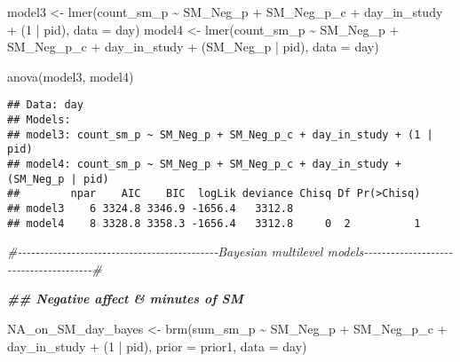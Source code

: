 \documentclass[
]{article}
\newenvironment{Shaded}{\begin{snugshade}}{\end{snugshade}}
\newcommand{\AttributeTok}[1]{\textcolor[rgb]{0.77,0.63,0.00}{#1}}
\newcommand{\CommentTok}[1]{\textcolor[rgb]{0.56,0.35,0.01}{\textit{#1}}}
\newcommand{\DecValTok}[1]{\textcolor[rgb]{0.00,0.00,0.81}{#1}}
\newcommand{\DocumentationTok}[1]{\textcolor[rgb]{0.56,0.35,0.01}{\textbf{\textit{#1}}}}
\newcommand{\FunctionTok}[1]{\textcolor[rgb]{0.00,0.00,0.00}{#1}}
\newcommand{\NormalTok}[1]{#1}
\newcommand{\OtherTok}[1]{\textcolor[rgb]{0.56,0.35,0.01}{#1}}
\newcommand{\SpecialCharTok}[1]{\textcolor[rgb]{0.00,0.00,0.00}{#1}}
\begin{document}
\begin{Shaded}
\begin{Highlighting}[]
\NormalTok{model3 }\OtherTok{\textless{}{-}} \FunctionTok{lmer}\NormalTok{(count\_sm\_p }\SpecialCharTok{\textasciitilde{}}\NormalTok{ SM\_Neg\_p }\SpecialCharTok{+}\NormalTok{ SM\_Neg\_p\_c }\SpecialCharTok{+}\NormalTok{ day\_in\_study }\SpecialCharTok{+}\NormalTok{ (}\DecValTok{1} \SpecialCharTok{|}\NormalTok{ pid), }\AttributeTok{data =}\NormalTok{ day)}
\NormalTok{model4 }\OtherTok{\textless{}{-}} \FunctionTok{lmer}\NormalTok{(count\_sm\_p }\SpecialCharTok{\textasciitilde{}}\NormalTok{ SM\_Neg\_p }\SpecialCharTok{+}\NormalTok{ SM\_Neg\_p\_c }\SpecialCharTok{+}\NormalTok{ day\_in\_study }\SpecialCharTok{+}\NormalTok{ (SM\_Neg\_p }\SpecialCharTok{|}\NormalTok{ pid), }\AttributeTok{data =}\NormalTok{ day)}

\FunctionTok{anova}\NormalTok{(model3, model4)}
\end{Highlighting}
\end{Shaded}

\begin{verbatim}
## Data: day
## Models:
## model3: count_sm_p ~ SM_Neg_p + SM_Neg_p_c + day_in_study + (1 | pid)
## model4: count_sm_p ~ SM_Neg_p + SM_Neg_p_c + day_in_study + (SM_Neg_p | pid)
##        npar    AIC    BIC  logLik deviance Chisq Df Pr(>Chisq)
## model3    6 3324.8 3346.9 -1656.4   3312.8                    
## model4    8 3328.8 3358.3 -1656.4   3312.8     0  2          1
\end{verbatim}

\begin{Shaded}
\begin{Highlighting}[]
\CommentTok{\#{-}{-}{-}{-}{-}{-}{-}{-}{-}{-}{-}{-}{-}{-}{-}{-}{-}{-}{-}{-}{-}{-}{-}{-}{-}{-}{-}{-}{-}{-}{-}{-}{-}{-}{-}{-}{-}{-}{-}{-}{-}{-}{-}{-}{-}Bayesian multilevel models{-}{-}{-}{-}{-}{-}{-}{-}{-}{-}{-}{-}{-}{-}{-}{-}{-}{-}{-}{-}{-}{-}{-}{-}{-}{-}{-}{-}{-}{-}{-}{-}{-}{-}{-}{-}{-}{-}{-}\#}


\DocumentationTok{\#\# Negative affect \& minutes of SM}

\NormalTok{NA\_on\_SM\_day\_bayes  }\OtherTok{\textless{}{-}} \FunctionTok{brm}\NormalTok{(sum\_sm\_p }\SpecialCharTok{\textasciitilde{}}\NormalTok{ SM\_Neg\_p }\SpecialCharTok{+}\NormalTok{ SM\_Neg\_p\_c }\SpecialCharTok{+}\NormalTok{ day\_in\_study }\SpecialCharTok{+}\NormalTok{ (}\DecValTok{1} \SpecialCharTok{|}\NormalTok{ pid), }\AttributeTok{prior =}\NormalTok{ prior1, }\AttributeTok{data =}\NormalTok{ day)}
\end{Highlighting}
\end{Shaded}
\end{document}
